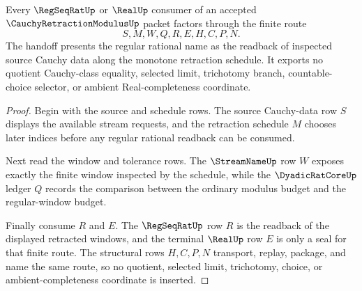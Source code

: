 \begin{theorem}
\label{thm:cauchy-retraction-modulus-regseqrat-handoff}
Every $\RegSeqRatUp$ or $\RealUp$ consumer of an accepted $\CauchyRetractionModulusUp$ packet factors through the finite route
$$
S,M,W,Q,R,E,H,C,P,N .
$$
The handoff presents the regular rational name as the readback of inspected source Cauchy data along the monotone retraction schedule. It exports no quotient Cauchy-class equality, selected limit, trichotomy branch, countable-choice selector, or ambient Real-completeness coordinate.
\end{theorem}
\begin{proof}
Begin with the source and schedule rows. The source Cauchy-data row $S$ displays the available stream requests, and the retraction schedule $M$ chooses later indices before any regular rational readback can be consumed.

Next read the window and tolerance rows. The $\StreamNameUp$ row $W$ exposes exactly the finite window inspected by the schedule, while the $\DyadicRatCoreUp$ ledger $Q$ records the comparison between the ordinary modulus budget and the regular-window budget.

Finally consume $R$ and $E$. The $\RegSeqRatUp$ row $R$ is the readback of the displayed retracted windows, and the terminal $\RealUp$ row $E$ is only a seal for that finite route. The structural rows $H,C,P,N$ transport, replay, package, and name the same route, so no quotient, selected limit, trichotomy, choice, or ambient-completeness coordinate is inserted.
\end{proof}




